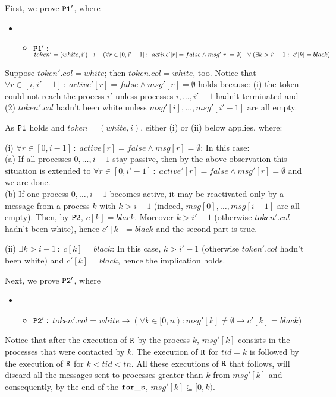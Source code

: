 \documentclass[runningheads]{llncs}
\newcommand{\1}{\u{a}}
\newcommand{\2}{\c{s}}
\newcommand{\5}{\c{t}}
\newcommand{\8}{\^{\i}}
\newcommand{\9}{\^{a}}
\newcommand{\svsp}{\vspace{1ex}}
\newcommand{\snvsp}{\vspace{-1ex}}
\newcommand{\bi}{\begin{itemize}}
\newcommand{\ei}{\end{itemize}}
\newcommand{\ra}{\rightarrow}
\newcommand{\co}{\,\colon\;}
\begin{document}
First, we prove ${\tt P1'}$, where\snvsp
\bi\item[]\bi\item[${\tt P1':}$] $token'=(white,i')\ra \\
\hspace*{.2cm}[(\forall r\in[0,i'-1]\co active'[r]=false\wedge msg'[r]=\emptyset)\\
\hspace*{.2cm}\vee(\exists k>i'-1\co c'[k]=black)]$\snvsp\ei\ei

Suppose $token'.col=white$; then $token.col=white$, too.  Notice that $\forall r\in[i,i'-1]\co
active'[r]=false\wedge msg'[r]=\emptyset$ holds because: (i) the token could not reach the process $i'$ unless
processes $i,\dots,i'-1$ hadn't terminated and (2) $token'.col$ hadn't been white unless
$msg'[i],\dots,msg'[i'-1]$ are all empty.

As ${\tt P1}$ holds and $token=(white,i)$, either (i) or (ii) below applies, where:

(i) $\forall r\in[0,i-1]\co active[r]=false\wedge msg[r]=\emptyset$: In this case:\\ (a) If all
processes $0,\dots,i-1$ stay passive, then by the above observation this situation is extended to $\forall
r\in[0,i'-1]\co active'[r]=false\wedge msg'[r]=\emptyset$ and we are done.\\ (b) If one process
$0,\dots,i-1$ becomes active, it may be reactivated only by a message from a process $k$ with $k>i-1$ (indeed,
$msg[0],\dots,msg[i-1]$ are all empty). Then, by ${\tt P2}$, $c[k]=black$. Moreover $k>i'-1$ (otherwise
$token'.col$ hadn't been white), hence $c'[k]=black$ and the second part is true.

(ii) $\exists k>i-1\co c[k]=black$: In this case, $k>i'-1$ (otherwise $token'.col$ hadn't been white)
and $c'[k]=black$, hence the implication holds.\svsp

Next, we prove ${\tt P2'}$, where\snvsp\bi\item[]\bi
\item[${\tt P2':}$] $token'.col=white\ra(\forall k\in [0,n):msg'[k]\not=\emptyset\ra c'[k]=black)$\snvsp\ei\ei

Notice that after the execution of ${\tt R}$ by the process $k$, $msg'[k]$ consists in the processes that were
contacted by $k$.  The execution of ${\tt R}$ for $tid=k$ is followed by the execution of ${\tt R}$ for
$k<tid<tn$.  All these executions of ${\tt R}$ that follows, will discard all the messages sent to processes
greater than $k$ from $msg'[k]$ and consequently, by the end of the ${\tt for\_s}$, $msg'[k]\subseteq [0,k)$.
\end{document}
